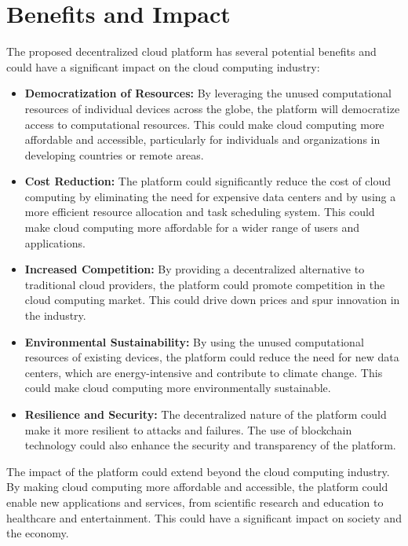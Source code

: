 \section{Benefits and Impact}
\label{sec:benefits_and_impact}

The proposed decentralized cloud platform has several potential benefits and could have a significant impact on the cloud computing industry:

\begin{itemize}
    \item \textbf{Democratization of Resources:} By leveraging the unused computational resources of individual devices across the globe, the platform will democratize access to computational resources. This could make cloud computing more affordable and accessible, particularly for individuals and organizations in developing countries or remote areas.

    \item \textbf{Cost Reduction:} The platform could significantly reduce the cost of cloud computing by eliminating the need for expensive data centers and by using a more efficient resource allocation and task scheduling system. This could make cloud computing more affordable for a wider range of users and applications.

    \item \textbf{Increased Competition:} By providing a decentralized alternative to traditional cloud providers, the platform could promote competition in the cloud computing market. This could drive down prices and spur innovation in the industry.

    \item \textbf{Environmental Sustainability:} By using the unused computational resources of existing devices, the platform could reduce the need for new data centers, which are energy-intensive and contribute to climate change. This could make cloud computing more environmentally sustainable.

    \item \textbf{Resilience and Security:} The decentralized nature of the platform could make it more resilient to attacks and failures. The use of blockchain technology could also enhance the security and transparency of the platform.
\end{itemize}

The impact of the platform could extend beyond the cloud computing industry. By making cloud computing more affordable and accessible, the platform could enable new applications and services, from scientific research and education to healthcare and entertainment. This could have a significant impact on society and the economy.
